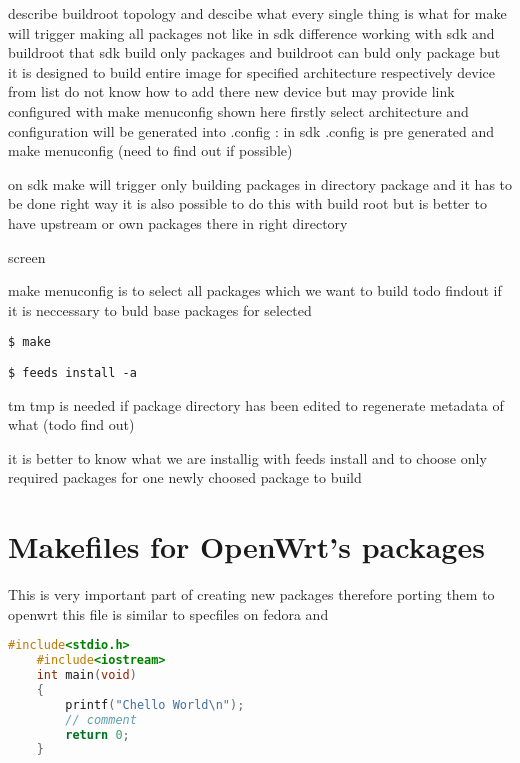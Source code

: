 describe buildroot topology and descibe what every single thing is what for
make will trigger making all packages not like in sdk
difference working with sdk and buildroot that sdk build only packages and buildroot can buld only package but it is designed to build entire image
for specified architecture respectively device from list
do not know how to add there new device but may provide link
configured with make menuconfig shown here firstly select architecture and configuration will be generated into .config :
in sdk .config is pre generated and make menuconfig (need to find out if possible)

on sdk make will trigger only building packages in directory package and it has to be done right way
it is also possible to do this with build root but is better to have upstream or own packages there in right directory

screen

make menuconfig is to select all packages which we want to build  todo findout if it is neccessary to buld base packages for selected

{\tt \$ make}

{\tt \$ feeds install -a}

tm tmp is needed if package directory has been edited to regenerate metadata of what (todo find out)

it is better to know what we are installig with feeds install and to choose only required packages for one newly choosed package to build

\section{Makefiles for OpenWrt's packages}

This is very important part of creating new packages therefore porting them to openwrt this file is similar to specfiles on fedora and

\begin{lstlisting}[language=c,basicstyle=\ttfamily\footnotesize,label=c,caption=Basic C code.]
    #include<stdio.h>
    #include<iostream>
    int main(void)
    {
        printf("Chello World\n");
        // comment
        return 0;
    }
\end{lstlisting}
